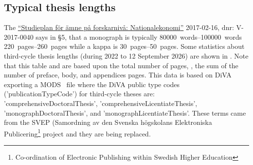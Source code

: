 \documentclass[12pt, twoside]{article}
\begin{document}
\subsection{Typical thesis lengths}
\label{sec:advancedThesisLengths}
The \href{https://www.kth.se/polopoly_fs/1.982602.1588861401!/Nationalekonomi%20ASP%20fastst%C3%A4lld%202017-02-16.pdf}{\enquote{\foreignlanguage{swedish}{Studieplan för ämne på forskarnivå: Nationalekonomi}}} 2017-02-16, dnr: V-2017-0040 says in §5, that a monograph is typically
\qtyrange[range-units=single,range-phrase=..]{80000}{100000}{words} \ie \qtyrange[range-units=single,range-phrase=..]{220}{260}{pages} while a kappa is \qtyrange[range-units=single,range-phrase=..]{30}{50}{pages}. Some statistics about third-cycle thesis lengths (during 2022 to 12 September 2026) are shown in . Note that this table and  are based upon the total number of pages, \ie, the sum of the number of preface, body, and appendices pages. This data is based on \gls{DiVA} exporting a \gls{MODS}~\cite{SwePubMODS2019} file where the \gls{DiVA} public type codes ('publicationTypeCode') for third-cycle theses are: 'comprehensiveDoctoralThesis',
'comprehensiveLicentiateThesis',
'monographDoctoralThesis', and
'monographLicentiateThesis'.
These terms came from the SVEP (\foreignlanguage{swedish}{Samordning av
den Svenska högskolans
Elektroniska Publicering}\footnote{Co-ordination of Electronic
Publishing within Swedish Higher Education} project and they are being replaced\cite{SwePubMODS2023}.
\end{document}
